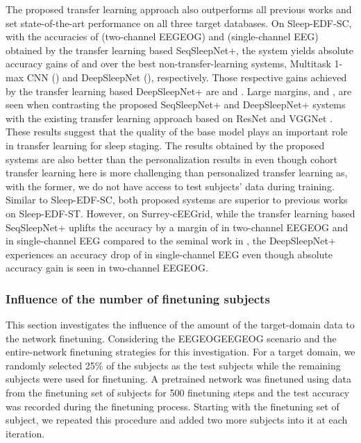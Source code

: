 \documentclass[journal,twoside,web]{ieeecolor}
\begin{document}
The proposed transfer learning approach also outperforms all previous works and set state-of-the-art performance on all three target databases. On Sleep-EDF-SC, with the accuracies of  (two-channel EEGEOG) and  (single-channel EEG) obtained by the transfer learning based SeqSleepNet+, the system yields absolute accuracy gains of  and  over the best non-transfer-learning systems, Multitask 1-max CNN \cite{Phan2019b} () and DeepSleepNet \cite{Supratak2017} (), respectively. Those respective gains achieved by the transfer learning based DeepSleepNet+ are  and . Large margins,  and , are seen when contrasting the proposed SeqSleepNet+ and DeepSleepNet+ systems with the existing transfer learning approach based on ResNet \cite{Andreotti2018} and VGGNet \cite{Vilamala2017}. These results suggest that the quality of the base model plays an important role in transfer learning for sleep staging. The results obtained by the proposed systems are also better than the personalization results in \cite{Mikkelsen2018} even though cohort transfer learning here is more challenging than personalized transfer learning as, with the former, we do not have access to test subjects' data during training. Similar to Sleep-EDF-SC, both proposed systems are superior to previous works on Sleep-EDF-ST. However, on Surrey-cEEGrid, while the transfer learning based SeqSleepNet+ uplifts the accuracy by a margin of  in two-channel EEGEOG and  in single-channel EEG compared to the seminal work in \cite{Mikkelsen2019}, the DeepSleepNet+ experiences an accuracy drop of  in single-channel EEG even though  absolute accuracy gain is seen in two-channel EEGEOG.

\subsubsection{Influence of the number of finetuning subjects}

This section investigates the influence of the amount of the target-domain data to the network finetuning. Considering the EEGEOGEEGEOG scenario and the entire-network finetuning strategies for this investigation. For a target domain, we randomly selected 25\% of the subjects as the test subjects while the remaining subjects were used for finetuning. A pretrained network was finetuned using data from the finetuning set of  subjects for 500 finetuning steps and the test accuracy was recorded during the finetuning process. Starting with the finetuning set of  subject, we repeated this procedure and added two more subjects into it at each iteration.
\end{document}
